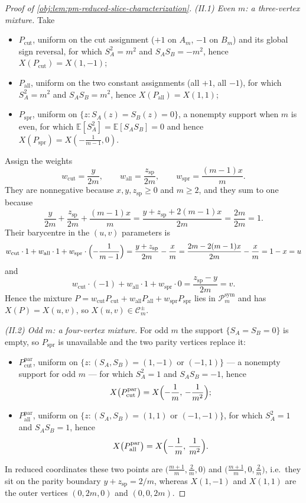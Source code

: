 \documentclass[11pt]{article}
\begin{document}
\begin{proof}[Proof of \cref{obj:lem:pm-reduced-slice-characterization}]
\emph{(II.1) Even \(m\): a three-vertex mixture.}  Take
\begin{itemize}
\item \(P_{\mathrm{cut}}\), uniform on the cut assignment (\(+1\) on \(A_m\), \(-1\) on \(B_m\)) and its global sign reversal, for which \(S_A^2=m^2\) and \(S_AS_B=-m^2\), hence \(X(P_{\mathrm{cut}})=X(1,-1)\); %
\item \(P_{\mathrm{all}}\), uniform on the two constant assignments (all \(+1\), all \(-1\)), for which \(S_A^2=m^2\) and \(S_AS_B=m^2\), hence \(X(P_{\mathrm{all}})=X(1,1)\); %
\item \(P_{\mathrm{spr}}\), uniform on \(\{z:S_A(z)=S_B(z)=0\}\), a nonempty support when \(m\) is even, for which \(\mathbb E[S_A^2]=\mathbb E[S_AS_B]=0\) and hence \(X(P_{\mathrm{spr}})=X\!\left(-\tfrac{1}{m-1},0\right)\). %
\end{itemize}
Assign the weights
\[
w_{\mathrm{cut}}=\frac{y}{2m},
\qquad
w_{\mathrm{all}}=\frac{z_{\mathrm{sp}}}{2m},
\qquad
w_{\mathrm{spr}}=\frac{(m-1)x}{m}.
\]
They are nonnegative because \(x,y,z_{\mathrm{sp}}\ge0\) and \(m\ge2\), and they sum to one because
\[
\frac{y}{2m}+\frac{z_{\mathrm{sp}}}{2m}+\frac{(m-1)x}{m}
=\frac{y+z_{\mathrm{sp}}+2(m-1)x}{2m}
=\frac{2m}{2m}=1 .
\]
Their barycentre in the \((u,v)\) parameters is
\[
w_{\mathrm{cut}}\cdot1+w_{\mathrm{all}}\cdot1+w_{\mathrm{spr}}\cdot\Bigl(-\frac{1}{m-1}\Bigr)
=\frac{y+z_{\mathrm{sp}}}{2m}-\frac{x}{m}
=\frac{2m-2(m-1)x}{2m}-\frac{x}{m}
=1-x=u
\]
and
\[
w_{\mathrm{cut}}\cdot(-1)+w_{\mathrm{all}}\cdot1+w_{\mathrm{spr}}\cdot0
=\frac{z_{\mathrm{sp}}-y}{2m}=v .
\]
Hence the mixture \(P=w_{\mathrm{cut}}P_{\mathrm{cut}}+w_{\mathrm{all}}P_{\mathrm{all}}+w_{\mathrm{spr}}P_{\mathrm{spr}}\) lies in \(\mathcal P_m^{\mathrm{sym}}\) and has \(X(P)=X(u,v)\), so \(X(u,v)\in\mathcal C_m^{\pm}\). %

\emph{(II.2) Odd \(m\): a four-vertex mixture.}  For odd \(m\) the support \(\{S_A=S_B=0\}\) is empty, so \(P_{\mathrm{spr}}\) is unavailable and the two parity vertices replace it:
\begin{itemize}
\item \(P^{\mathrm{par}}_{\mathrm{cut}}\), uniform on \(\{z:(S_A,S_B)=(1,-1)\text{ or }(-1,1)\}\) --- a nonempty support for odd \(m\) --- for which \(S_A^2=1\) and \(S_AS_B=-1\), hence
\[
X\bigl(P^{\mathrm{par}}_{\mathrm{cut}}\bigr)=X\Bigl(-\frac1m,\,-\frac1{m^2}\Bigr);
\]
\item \(P^{\mathrm{par}}_{\mathrm{all}}\), uniform on \(\{z:(S_A,S_B)=(1,1)\text{ or }(-1,-1)\}\), for which \(S_A^2=1\) and \(S_AS_B=1\), hence
\[
X\bigl(P^{\mathrm{par}}_{\mathrm{all}}\bigr)=X\Bigl(-\frac1m,\,\frac1{m^2}\Bigr).
\]
\end{itemize}
In reduced coordinates these two points are \(\bigl(\tfrac{m+1}{m},\tfrac2m,0\bigr)\) and \(\bigl(\tfrac{m+1}{m},0,\tfrac2m\bigr)\), i.e.\ they sit on the parity boundary \(y+z_{\mathrm{sp}}=2/m\), whereas \(X(1,-1)\) and \(X(1,1)\) are the outer vertices \((0,2m,0)\) and \((0,0,2m)\).


\end{proof}
\end{document}
